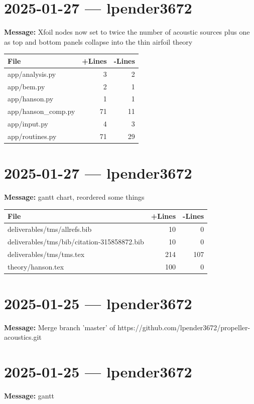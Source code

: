 \documentclass{article}
\begin{document}
\section*{2025-01-27 --- lpender3672}
\textbf{Message:} Xfoil nodes now set to twice the number of acoustic sources plus one as top and bottom panels collapse into the thin airfoil theory

\begin{longtable}{|p{10cm}|r|r|}
\hline \textbf{File} & \textbf{+Lines} & \textbf{-Lines} \\
\hline
app/analysis.py & 3 & 2 \\
\hline
app/bem.py & 2 & 1 \\
\hline
app/hanson.py & 1 & 1 \\
\hline
app/hanson\_comp.py & 71 & 11 \\
\hline
app/input.py & 4 & 3 \\
\hline
app/routines.py & 71 & 29 \\
\hline
\end{longtable}

\section*{2025-01-27 --- lpender3672}
\textbf{Message:} gantt chart, reordered some things

\begin{longtable}{|p{10cm}|r|r|}
\hline \textbf{File} & \textbf{+Lines} & \textbf{-Lines} \\
\hline
deliverables/tms/allrefs.bib & 10 & 0 \\
\hline
deliverables/tms/bib/citation-315858872.bib & 10 & 0 \\
\hline
deliverables/tms/tms.tex & 214 & 107 \\
\hline
theory/hanson.tex & 100 & 0 \\
\hline
\end{longtable}

\section*{2025-01-25 --- lpender3672}
\textbf{Message:} Merge branch 'master' of https://github.com/lpender3672/propeller-acoustics.git

\section*{2025-01-25 --- lpender3672}
\textbf{Message:} gantt
\end{document}
